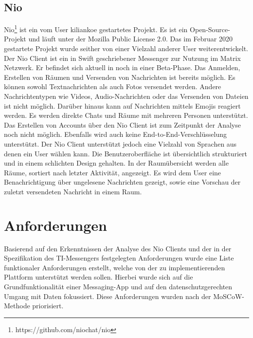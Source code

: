     \subsection{Nio}
    Nio\footnote{https://github.com/niochat/nio} ist ein vom User kiliankoe gestartetes Projekt.
    Es ist ein Open-Source-Projekt und läuft unter der Mozilla Public License 2.0.
    Das im Februar 2020 gestartete Projekt wurde seither von einer Vielzahl anderer User weiterentwickelt.
    Der Nio Client ist ein in Swift geschriebener Messenger zur Nutzung im Matrix Netzwerk.
    Er befindet sich aktuell in noch in einer Beta-Phase.
    Das Anmelden, Erstellen von Räumen und Versenden von Nachrichten ist bereits möglich.
    Es können sowohl Textnachrichten als auch Fotos versendet werden.
    Andere Nachrichtentypen wie Videos, Audio-Nachrichten oder das Versenden von Dateien ist nicht möglich.
    Darüber hinaus kann auf Nachrichten mittels Emojis reagiert werden.
    Es werden direkte Chats und Räume mit mehreren Personen unterstützt.
    Das Erstellen von Accounts über den Nio Client ist zum Zeitpunkt der Analyse noch nicht möglich.
    Ebenfalls wird auch keine End-to-End-Verschlüsselung unterstützt.
    Der Nio Client unterstützt jedoch eine Vielzahl von Sprachen aus denen ein User wählen kann.
    Die Benutzeroberfläche ist übersichtlich strukturiert und in einem schlichten Design gehalten.
    In der Raumübersicht werden alle Räume, sortiert nach letzter Aktivität, angezeigt.
    Es wird dem User eine Benachrichtigung über ungelesene Nachrichten gezeigt, sowie eine Vorschau der zuletzt versendeten Nachricht in einem Raum.

    \newpage
    \section{Anforderungen}\label{sec:anforderungen}
    Basierend auf den Erkenntnissen der Analyse des Nio Clients und der in der Spezifikation des TI-Messengers festgelegten Anforderungen wurde eine Liste funktionaler Anforderungen erstellt, welche von der zu implementierenden Plattform unterstützt werden sollen.
    Hierbei wurde sich auf die Grundfunktionalität einer Messaging-App und auf den datenschutzgerechten Umgang mit Daten fokussiert.
    Diese Anforderungen wurden nach der MoSCoW-Methode priorisiert.\\

